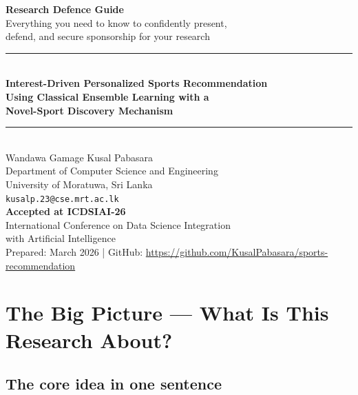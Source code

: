 \documentclass[12pt,a4paper]{article}
\begin{document}
\begin{titlepage}
\centering
\vspace*{2cm}
{\Huge\bfseries\color{headerblue} Research Defence Guide}\\[0.5cm]
{\large\color{gray} Everything you need to know to confidently present,\\
defend, and secure sponsorship for your research}\\[1.5cm]
\rule{0.8\textwidth}{1pt}\\[0.8cm]
{\Large\bfseries Interest-Driven Personalized Sports Recommendation\\
Using Classical Ensemble Learning with a\\
Novel-Sport Discovery Mechanism}\\[0.8cm]
\rule{0.8\textwidth}{0.5pt}\\[1cm]
{\large Wandawa Gamage Kusal Pabasara}\\[0.2cm]
{\normalsize Department of Computer Science and Engineering\\
University of Moratuwa, Sri Lanka\\
\texttt{kusalp.23@cse.mrt.ac.lk}}\\[1cm]
{\normalsize\color{accentgreen}\bfseries Accepted at ICDSIAI-26}\\[0.3cm]
{\normalsize International Conference on Data Science Integration\\
with Artificial Intelligence}\\[2cm]
{\small\color{gray} Prepared: March 2026 \quad|\quad
GitHub: \url{https://github.com/KusalPabasara/sports-recommendation}}
\end{titlepage}

\tableofcontents
\newpage

\section{The Big Picture --- What Is This Research About?}

\subsection{The core idea in one sentence}
\end{document}
